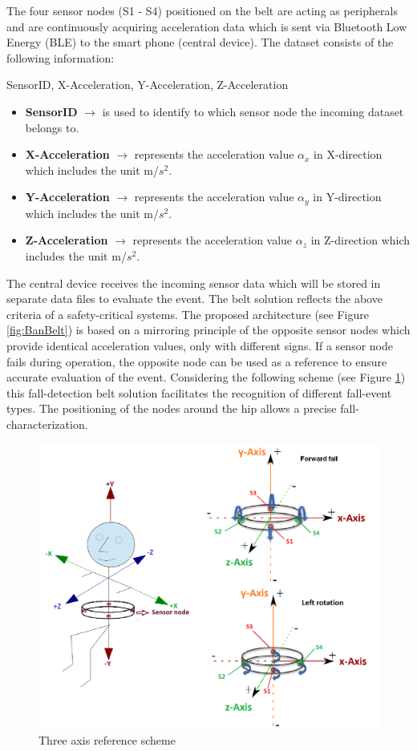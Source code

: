 \documentclass[review]{elsarticle}
\begin{document}
The four sensor nodes (S1 - S4) positioned on the belt are acting as peripherals and are continuously acquiring acceleration data which is sent via Bluetooth Low Energy (BLE) to the smart phone (central device). The dataset consists of the following information: 
\begin{center}
 SensorID, X-Acceleration, Y-Acceleration, Z-Acceleration
\end{center}
\begin{itemize}
	\item \textbf{SensorID} $\rightarrow$ is used to identify to which sensor node the incoming dataset belongs to.
	\item \textbf{X-Acceleration} $\rightarrow$ represents the acceleration value $\alpha_{x}$ in X-direction which includes the unit m/$s^2$.
	\item \textbf{Y-Acceleration} $\rightarrow$ represents the acceleration value $\alpha_{y}$ in Y-direction which includes the unit m/$s^2$.
	\item \textbf{Z-Acceleration} $\rightarrow$ represents the acceleration value $\alpha_{z}$ in Z-direction which includes the unit m/$s^2$.
\end{itemize}
The central device receives the incoming sensor data which will be stored in separate data files to evaluate the event. 
The belt solution reflects the above criteria of a safety-critical systems. The proposed architecture (see Figure \ref{fig:BanBelt}) is based on a mirroring principle of the opposite sensor nodes which provide identical acceleration values, only with different signs. If a sensor node fails during operation, the opposite node can be used as a reference to ensure accurate evaluation of the event.  Considering the following scheme (see Figure \ref{fig:ReferenceScheme}) this fall-detection belt solution facilitates the recognition of different fall-event types. The positioning of the nodes around the hip allows a precise fall-characterization.
\begin{figure}[!ht]
	\centering
	\includegraphics[scale=0.315]{images/axis}
	\caption[Three axis reference scheme]{Three axis reference scheme \cite{LaBlunda.2016,LuigiMasterThesis}}
	\label{fig:ReferenceScheme}
\end{figure}
\end{document}
